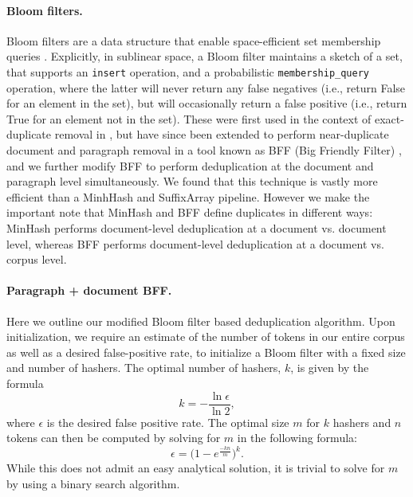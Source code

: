 \documentclass{article}
\begin{document}
\paragraph{Bloom filters.} Bloom filters are a data structure that enable space-efficient set membership queries \citep{bloom1970space}. Explicitly, in sublinear space, a Bloom filter maintains a sketch of a set, that supports an \texttt{insert} operation, and a probabilistic \texttt{membership\_query} operation, where the latter will never return any false negatives (i.e., return False for an element in the set), but will occasionally return a false positive (i.e., return True for an element not in the set). These were first used in the context of exact-duplicate removal in \citet{soldaini2024dolma}, but have since been extended to perform near-duplicate document and paragraph removal  in a tool known as BFF (Big Friendly Filter) \citep{bff}, and we further modify BFF to perform deduplication at the document and paragraph level simultaneously. We found that this technique is vastly more efficient than a MinhHash and SuffixArray pipeline. However we make the important note that MinHash and BFF define duplicates in different ways: MinHash performs document-level deduplication at a document vs. document level, whereas BFF performs document-level deduplication at a document vs. corpus level.

\paragraph{Paragraph + document BFF.} Here we outline our modified Bloom filter based deduplication algorithm. Upon initialization, we require an estimate of the number of tokens in our entire corpus as well as a desired false-positive rate, to initialize a Bloom filter with a fixed size and number of hashers. The optimal number of hashers, $k$, is given by the formula
\[k=-\frac{\ln{\epsilon}}{\ln{2}},\]
where $\epsilon$ is the desired false positive rate. The optimal size $m$ for $k$ hashers and $n$ tokens can then be computed by solving for $m$ in the following formula:
\[\epsilon = \Big(1-e^\frac{-kn}{m}\Big)^k.\]
While this does not admit an easy analytical solution, it is trivial to solve for $m$ by using a binary search algorithm.
\end{document}
